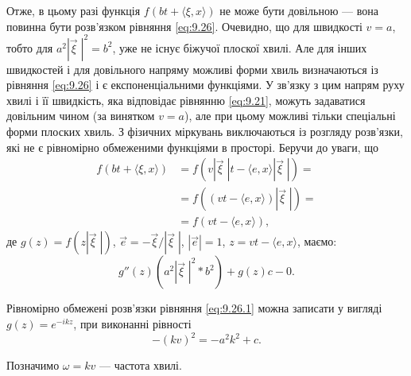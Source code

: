 Отже, в цьому разі функція $f(b t + \langle \xi, x \rangle)$ не може бути довільною --- вона повинна бути розв'язком рівняння \eqref{eq:9.26}. Очевидно, що для швидкості $v = a$, тобто для $a^2 \left| \vec \xi \; \right|^2 = b^2$, уже не існує біжучої плоскої хвилі. Але для інших швидкостей і для довільного напряму можливі форми хвиль визначаються із рівняння \eqref{eq:9.26} і є експоненціальними функціями. У зв'язку з цим напрям руху хвилі і її швидкість, яка відповідає рівнянню \eqref{eq:9.21}, можуть задаватися довільним чином (за винятком $v = a$), але при цьому можливі тільки спеціальні форми плоских хвиль. З фізичних міркувань виключаються із розгляду розв'язки, які не є рівномірно обмеженими функціями в просторі. Беручи до уваги, що
\begin{equation}
    \begin{aligned}
        f(b t + \langle \xi, x \rangle) &= f \left( v \left| \vec \xi \; \right| t - \langle e, x \rangle \left| \vec \xi \; \right| \right) = \\
        &= f \left( (v t - \langle e, x \rangle ) \left| \vec \xi \; \right| \right) = \\
        &= f (v t - \langle e, x \rangle),
    \end{aligned}
\end{equation}
де $g(z) = f \left( z \left| \vec \xi \; \right| \right)$, $\vec e = - \vec \xi / \left| \vec \xi \; \right|$, $\left| \vec e \right| = 1$, $z = v t - \langle e, x \rangle$, маємо:
\begin{equation}
    \label{eq:9.26.1}
    g''(z) \left( a^2 \left| \vec \xi \; \right|^2 * b^2 \right) + g(z) c - 0.
\end{equation}

Рівномірно обмежені розв'язки рівняння \eqref{eq:9.26.1} можна записати у вигляді $g(z) = e^{-ikz}$, при виконанні рівності
\begin{equation}
    \label{eq:9.27}
    - (k v)^2 = - a^2 k^2 + c.
\end{equation}

Позначимо $\omega = kv$ --- частота хвилі. \medskip

